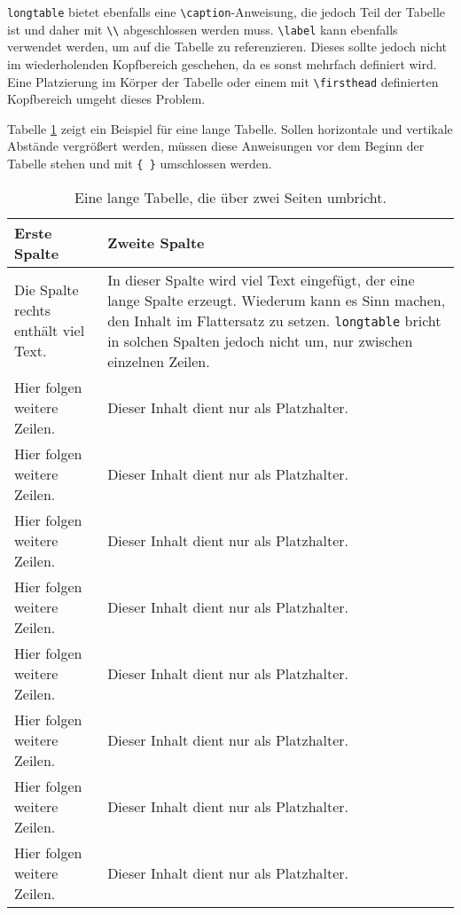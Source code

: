 \texttt{longtable} bietet ebenfalls eine \verb|\caption|-Anweisung, die jedoch Teil der Tabelle ist und daher mit \verb|\\|
abgeschlossen werden muss. \verb|\label| kann ebenfalls verwendet werden, um auf die Tabelle zu referenzieren. Dieses sollte
jedoch nicht im wiederholenden Kopfbereich geschehen, da es sonst mehrfach definiert wird. Eine Platzierung im
Körper der Tabelle oder einem mit \verb|\firsthead| definierten Kopfbereich umgeht dieses Problem.

Tabelle \ref{tab:longtable} zeigt ein Beispiel für eine lange Tabelle. Sollen horizontale und vertikale Abstände vergrößert werden,
müssen diese Anweisungen vor dem Beginn der Tabelle stehen und mit \verb|{ }| umschlossen werden.

{
	\setlength{\tabcolsep}{10pt} %
	\def\arraystretch{1.50}      %
	\begin{longtable}{@{}lp{}@{}}
		\caption{Eine lange Tabelle, die über zwei Seiten umbricht.} \\
		\toprule
		Erste Spalte & Zweite Spalte \\
		\midrule\endhead
		\label{tab:longtable}
		Die Spalte rechts enthält viel Text. & In dieser Spalte wird viel Text eingefügt, der eine lange Spalte erzeugt. Wiederum kann es Sinn machen, den Inhalt im Flattersatz zu setzen. \texttt{longtable} bricht in solchen Spalten jedoch nicht um, nur zwischen einzelnen Zeilen. \\
		Hier folgen weitere Zeilen. & Dieser Inhalt dient nur als Platzhalter. \\
		Hier folgen weitere Zeilen. & Dieser Inhalt dient nur als Platzhalter. \\
		Hier folgen weitere Zeilen. & Dieser Inhalt dient nur als Platzhalter. \\
		Hier folgen weitere Zeilen. & Dieser Inhalt dient nur als Platzhalter. \\
		Hier folgen weitere Zeilen. & Dieser Inhalt dient nur als Platzhalter. \\
		Hier folgen weitere Zeilen. & Dieser Inhalt dient nur als Platzhalter. \\
		Hier folgen weitere Zeilen. & Dieser Inhalt dient nur als Platzhalter. \\
		Hier folgen weitere Zeilen. & Dieser Inhalt dient nur als Platzhalter. \\
		\bottomrule
	\end{longtable}
}

